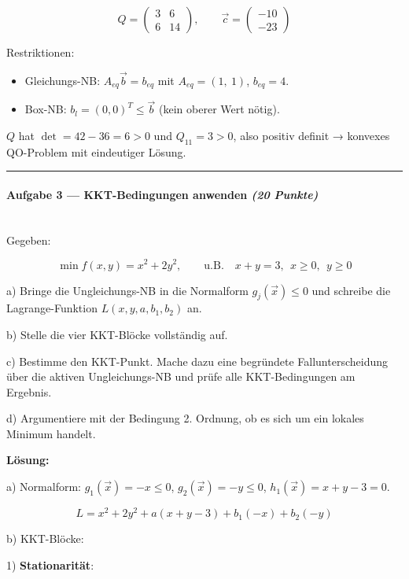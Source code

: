 \documentclass[11pt, a4paper]{article}
\begin{document}
\[
Q = \begin{pmatrix} 3 & 6 \\ 6 & 14 \end{pmatrix},\qquad \vec{c} = \begin{pmatrix} -10 \\ -23 \end{pmatrix}
\]


Restriktionen:

\begin{itemize}
  \item Gleichungs-NB: $A_{eq}\vec{b} = b_{eq}$ mit $A_{eq} = (1,\ 1)$, $b_{eq} = 4$.
  \item Box-NB: $b_l = (0,0)^T \le \vec{b}$ (kein oberer Wert nötig).
\end{itemize}

$Q$ hat $\det = 42 - 36 = 6 > 0$ und $Q_{11} = 3 > 0$, also positiv definit → konvexes QO-Problem mit eindeutiger Lösung.



\noindent\textcolor{rulegray}{\rule{\linewidth}{0.4pt}}


\paragraph{Aufgabe 3 — KKT-Bedingungen anwenden \textit{(20 Punkte)}}\mbox{}\\[2pt]

Gegeben:


\[
\min f(x,y) = x^2 + 2y^2,\qquad \text{u.B.}\quad x+y = 3,\ \ x \ge 0,\ \ y \ge 0
\]


a) Bringe die Ungleichungs-NB in die Normalform $g_j(\vec{x}) \le 0$ und schreibe die Lagrange-Funktion $L(x,y,a,b_1,b_2)$ an.

b) Stelle die vier KKT-Blöcke vollständig auf.

c) Bestimme den KKT-Punkt. Mache dazu eine begründete Fallunterscheidung über die aktiven Ungleichungs-NB und prüfe alle KKT-Bedingungen am Ergebnis.

d) Argumentiere mit der Bedingung 2. Ordnung, ob es sich um ein lokales Minimum handelt.


\textbf{Lösung:}


a) Normalform: $g_1(\vec{x}) = -x \le 0$, $g_2(\vec{x}) = -y \le 0$, $h_1(\vec{x}) = x+y-3 = 0$.


\[
L = x^2 + 2y^2 + a(x+y-3) + b_1(-x) + b_2(-y)
\]


b) KKT-Blöcke:


1) \textbf{Stationarität}:
\end{document}
